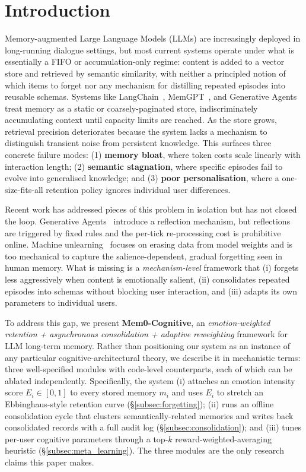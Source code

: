 \section{Introduction}
\label{sec:introduction}

Memory-augmented Large Language Models (LLMs) are increasingly deployed in long-running dialogue settings, but most current systems operate under what is essentially a FIFO or accumulation-only regime: content is added to a vector store and retrieved by semantic similarity, with neither a principled notion of which items to forget nor any mechanism for distilling repeated episodes into reusable schemas. Systems like LangChain~\cite{langchain}, MemGPT~\cite{memgpt}, and Generative Agents~\cite{generative_agents} treat memory as a static or coarsely-paginated store, indiscriminately accumulating context until capacity limits are reached. As the store grows, retrieval precision deteriorates because the system lacks a mechanism to distinguish transient noise from persistent knowledge. This surfaces three concrete failure modes: (1) \textbf{memory bloat}, where token costs scale linearly with interaction length; (2) \textbf{semantic stagnation}, where specific episodes fail to evolve into generalised knowledge; and (3) \textbf{poor personalisation}, where a one-size-fits-all retention policy ignores individual user differences.

Recent work has addressed pieces of this problem in isolation but has not closed the loop. Generative Agents~\cite{generative_agents} introduce a reflection mechanism, but reflections are triggered by fixed rules and the per-tick re-processing cost is prohibitive online. Machine unlearning~\cite{sekhar2021unlearning} focuses on erasing data from model weights and is too mechanical to capture the salience-dependent, gradual forgetting seen in human memory. What is missing is a \emph{mechanism-level} framework that (i) forgets less aggressively when content is emotionally salient, (ii) consolidates repeated episodes into schemas without blocking user interaction, and (iii) adapts its own parameters to individual users.

To address this gap, we present \textbf{Mem0-Cognitive}, an \emph{emotion-weighted retention + asynchronous consolidation + adaptive reweighting} framework for LLM long-term memory. Rather than positioning our system as an instance of any particular cognitive-architectural theory, we describe it in mechanistic terms: three well-specified modules with code-level counterparts, each of which can be ablated independently. Specifically, the system (i) attaches an emotion intensity score $E_i \in [0, 1]$ to every stored memory $m_i$ and uses $E_i$ to stretch an Ebbinghaus-style retention curve (\S\ref{subsec:forgetting}); (ii) runs an offline consolidation cycle that clusters semantically-related memories and writes back consolidated records with a full audit log (\S\ref{subsec:consolidation}); and (iii) tunes per-user cognitive parameters through a top-$k$ reward-weighted-averaging heuristic (\S\ref{subsec:meta_learning}). The three modules are the only research claims this paper makes.


